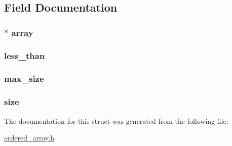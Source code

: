 \subsection{Field Documentation}
\hypertarget{structordered__array__t_a6035ea45258f7731eff12377d4e95ae2}{
\subsubsection[{array}]{$\ast$ {\bf array}}}
\label{structordered__array__t_a6035ea45258f7731eff12377d4e95ae2}
\hypertarget{structordered__array__t_aec29c0ec7f484bdd60b42c7ef04aa25f}{
\subsubsection[{less\_\-than}]{ {\bf less\_\-than}}}
\label{structordered__array__t_aec29c0ec7f484bdd60b42c7ef04aa25f}
\hypertarget{structordered__array__t_aff98f60fdff673e586a88d147da4798c}{
\subsubsection[{max\_\-size}]{ {\bf max\_\-size}}}
\label{structordered__array__t_aff98f60fdff673e586a88d147da4798c}
\hypertarget{structordered__array__t_a8c5ccb4d457cb24df33a7c9facfa2650}{
\subsubsection[{size}]{ {\bf size}}}
\label{structordered__array__t_a8c5ccb4d457cb24df33a7c9facfa2650}


The documentation for this struct was generated from the following file:\begin{DoxyCompactItemize}
\item 
\hyperlink{ordered__array_8h}{ordered\_\-array.h}\end{DoxyCompactItemize}
